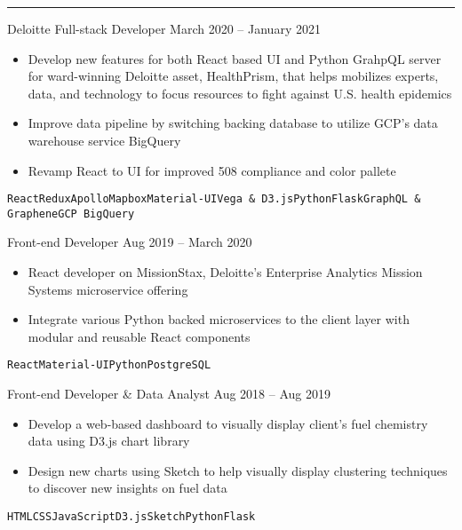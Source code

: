 \documentclass[9pt]{resume} %
\begin{document}
\begin{minipage}[t]{1\textwidth} %
	\vspace{-\baselineskip} %
	
	\hrule
	\begin{entrylist}{Deloitte}
		\entry
			{Full-stack Developer}
			{March 2020 -- January 2021}
			{\begin{itemize}[noitemsep,topsep=0pt,leftmargin=*]
				\item Develop new features for both React based UI and Python GrahpQL server for ward-winning Deloitte asset, HealthPrism, that helps mobilizes experts, data, and technology to focus resources to fight against U.S. health epidemics
				\item Improve data pipeline by switching backing database to utilize GCP's data warehouse service BigQuery
				\item Revamp React to UI for improved 508 compliance and color pallete
			\end{itemize}
			{\addtolength{\leftskip}{3mm}\texttt{React}\slashsep\texttt{Redux}\slashsep\texttt{Apollo}\slashsep\texttt{Mapbox}\slashsep\texttt{Material-UI}\slashsep\texttt{Vega \& D3.js}\slashsep\texttt{Python}\slashsep\texttt{Flask}\slashsep\texttt{GraphQL \& Graphene}\slashsep\texttt{GCP BigQuery}\par}}
				
		\entry
			{Front-end Developer}
			{Aug 2019 -- March 2020}
			{{\begin{itemize}[noitemsep,topsep=0pt,leftmargin=*]
				\item React developer on MissionStax, Deloitte's Enterprise Analytics Mission Systems microservice offering
 				\item Integrate various Python backed microservices to the client layer with modular and reusable React components
			\end{itemize}}
			{\addtolength{\leftskip}{3mm}\texttt{React}\slashsep\texttt{Material-UI}\slashsep\texttt{Python}\slashsep\texttt{PostgreSQL}\par}}
			
		\entry
			{Front-end Developer \& Data Analyst}
			{Aug 2018 -- Aug 2019}
			{{\begin{itemize}[noitemsep,topsep=0pt,leftmargin=*]
				\item Develop a web-based dashboard to visually display client's fuel chemistry data using D3.js chart library
				\item Design new charts using Sketch to help visually display clustering techniques to discover new insights on fuel data
			\end{itemize}}					
			{\addtolength{\leftskip}{3mm}\texttt{HTML}\slashsep\texttt{CSS}\slashsep\texttt{JavaScript}\slashsep\texttt{D3.js}\slashsep\texttt{Sketch}\slashsep\texttt{Python}\slashsep\texttt{Flask}\par}}


\end{entrylist}
\end{minipage}
\end{document}
